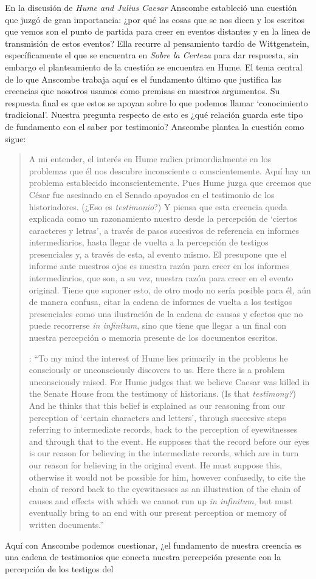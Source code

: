 En la discusión de \emph{Hume and Julius Caesar} Anscombe estableció una cuestión que juzgó de gran importancia: ¿por qué las cosas que se nos dicen y los escritos que vemos son el punto de partida para creer en eventos distantes y en la linea de transmisión de estos eventos? Ella recurre al pensamiento tardío de Wittgenstein, específicamente el que se encuentra en \emph{Sobre la Certeza} para dar respuesta, sin embargo el planteamiento de la cuestión se encuentra en Hume. El tema central de lo que Anscombe trabaja aquí es el fundamento último que justifica las creencias que nosotros usamos como premisas en nuestros argumentos. Su respuesta final es que estos se apoyan sobre lo que podemos llamar `conocimiento tradicional'. Nuestra pregunta respecto de esto es ¿qué relación guarda este tipo de fundamento con el saber por testimonio? Anscombe plantea la cuestión  como sigue: \blockquote[{\cite[121--122]{anscombe2011plato:humecaus}}: \enquote{To my mind the interest of Hume lies primarily in the problems he consciously or unconsciously discovers to us. Here there is a problem unconsciously raised. For Hume judges that we believe Caesar was killed in the Senate House from the testimony of historians. (Is that \emph{testimony?}) And he thinks that this belief is explained as our reasoning from our perception of `certain characters and letters', through succesive steps referring to intermediate records, back to the perception of eyewitnesses and through that to the event. He supposes that the record before our eyes is our reason for believing in the intermediate records, which are in turn our reason for believing in the original event. He must suppose this, otherwise it would not be possible for him, however confusedly, to cite the chain of record back to the eyewitnesses as an illustration of the chain of causes and effects with which we cannot run up \emph{in infinitum}, but must eventually bring to an end with our present perception or memory of written documents.}]{A mi entender, el interés en Hume radica primordialmente en los problemas que él nos descubre inconsciente o conscientemente. Aquí hay un problema establecido inconscientemente. Pues Hume juzga que creemos que César fue asesinado en el Senado apoyados en el testimonio de los historiadores. (¿Eso es \emph{testimonio}?) Y piensa que esta creencia queda explicada como un razonamiento nuestro desde la percepción de `ciertos caracteres y letras', a través de pasos sucesivos de referencia en informes intermediarios, hasta llegar de vuelta a la percepción de testigos presenciales y, a través de esta, al evento mismo. El presupone que el informe ante nuestros ojos es nuestra razón para creer en los informes intermediarios, que son, a su vez, nuestra razón para creer en el evento original. Tiene que suponer esto, de otro modo no sería posible para él, aún de manera confusa, citar la cadena de informes de vuelta a los testigos presenciales como una ilustración de la cadena de causas y efectos que no puede recorrerse \emph{in infinitum}, sino que tiene que llegar a un final con nuestra percepción o memoria presente de los documentos escritos.} Aquí con Anscombe podemos cuestionar, ¿el fundamento de nuestra creencia es una cadena de testimonios que conecta nuestra percepción presente con la percepción de los testigos del 